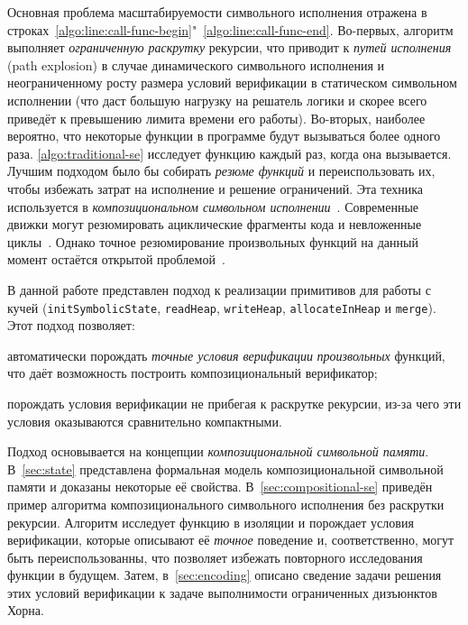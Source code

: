 Основная проблема масштабируемости символьного исполнения отражена в строках~\ref{algo:line:call-func-begin}"~\ref{algo:line:call-func-end}. Во-первых, алгоритм выполняет \emph{ограниченную раскрутку} рекурсии, что приводит к \emph{ путей исполнения} (path explosion) в случае динамического символьного исполнения и неограниченному росту размера условий верификации в статическом символьном исполнении (что даст большую нагрузку на решатель логики и скорее всего приведёт к превышению лимита времени его работы).
Во-вторых, наиболее вероятно, что некоторые функции в программе будут вызываться более одного раза. \autoref{algo:traditional-se} исследует функцию каждый раз, когда она вызывается. Лучшим подходом было бы собирать \emph{резюме функций} и переиспользовать их, чтобы избежать затрат на исполнение и решение ограничений. Эта техника используется в \emph{композициональном символьном исполнении}~\cite{christakis2015ic,godefroid2007compositional,lin2016compositional}. Современные движки могут резюмировать ациклические фрагменты кода и невложенные циклы~\cite{xie2016proteus}. Однако точное резюмирование произвольных функций на данный момент остаётся открытой проблемой~\cite{SurveySymExec-CSUR18}.

В данной работе представлен подход к реализации примитивов для работы с кучей (\texttt{initSymbolicState}, \texttt{readHeap}, \texttt{writeHeap}, \texttt{allocateInHeap} и \texttt{merge}). Этот подход позволяет:
\begin{enumerate*}[label=\alph*)]
    \item автоматически порождать \emph{точные условия верификации} \emph{произвольных} функций, что даёт возможность построить композициональный верификатор;
    \item порождать условия верификации не прибегая к раскрутке рекурсии, из-за чего эти условия оказываются сравнительно компактными.
\end{enumerate*}

Подход основывается на концепции \emph{композициональной символьной памяти}. В~\autoref{sec:state} представлена формальная модель композициональной символьной памяти и доказаны некоторые её свойства. В~\autoref{sec:compositional-se} приведён пример алгоритма композиционального символьного исполнения без раскрутки рекурсии. Алгоритм исследует функцию в изоляции и порождает условия верификации, которые описывают её \emph{точное} поведение и, соответственно, могут быть переиспользованны, что позволяет избежать повторного исследования функции в будущем. Затем, в~\autoref{sec:encoding} описано сведение задачи решения этих условий верификации к задаче выполнимости ограниченных дизъюнктов Хорна.
